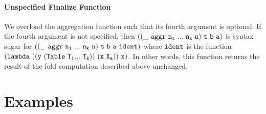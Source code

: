 \documentclass[english,a4paper,10pt]{article}
\begin{document}
\paragraph{Unspecified Finalize Function}
We overload the aggregation function
such that its fourth argument is optional.
If the fourth argument is not specified,
then 
$
{\tt 
((\_\ aggr\ n_1\ ...\ n_k\ n)\ t\ b\ a)
}
$
is syntax sugar for
$
{\tt 
((\_\ aggr\ n_1\ ...\ n_k\ n)\ t\ b\ a\ ident)
}
$
where ${\tt ident}$ is the function
${\tt (lambda\ ((y\ (Table\ T_1 ...\ T_k))\ (x\ X_a))\ x)}$.
In other words, this function returns the result of the
fold computation described above unchanged.

\section{Examples}
\end{document}
